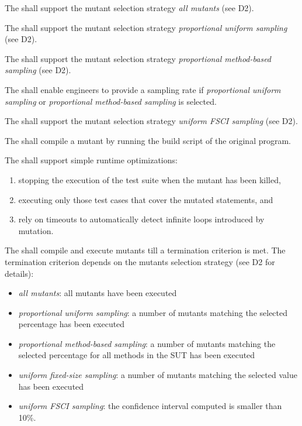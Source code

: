 \RQ{} The \FAQAS shall support the mutant selection strategy \textit{all mutants} (see D2).

\RQ{} The \FAQAS shall support the mutant selection strategy \textit{proportional uniform sampling} (see D2).

\RQ{} The \FAQAS shall support the mutant selection strategy \textit{proportional method-based sampling} (see D2).

\RQ{} The \FAQAS shall enable engineers to provide a sampling rate if \textit{proportional uniform sampling} or \textit{proportional method-based sampling} is selected.

\RQ{} The \FAQAS shall support the mutant selection strategy \textit{uniform FSCI sampling} (see D2).

\RQ{} The \FAQAS shall compile a mutant by running the build script of the original program.

\RQ{} The \FAQAS shall support simple runtime optimizations:
\begin{enumerate}
	\item stopping the execution of the test suite when the mutant has been killed,
	\item executing only those test cases that cover the mutated statements, and 
	\item rely on timeouts to automatically detect infinite loops introduced by mutation.
\end{enumerate}


\RQ{} The \FAQAS shall compile and execute mutants till a termination criterion is met. The termination criterion depends on the mutants selection strategy (see D2 for details):
\begin{itemize}
	\item \emph{all mutants}: all mutants have been executed
	\item \emph{proportional uniform sampling}: a number of mutants matching the selected percentage has been executed
	\item \emph{proportional method-based sampling}: a number of mutants matching the selected percentage for all methods in the SUT has been executed
	\item \emph{uniform fixed-size sampling}: a number of mutants matching the selected value has been executed
	\item \emph{uniform FSCI sampling}: the confidence interval computed is smaller than 10\%.
\end{itemize}

